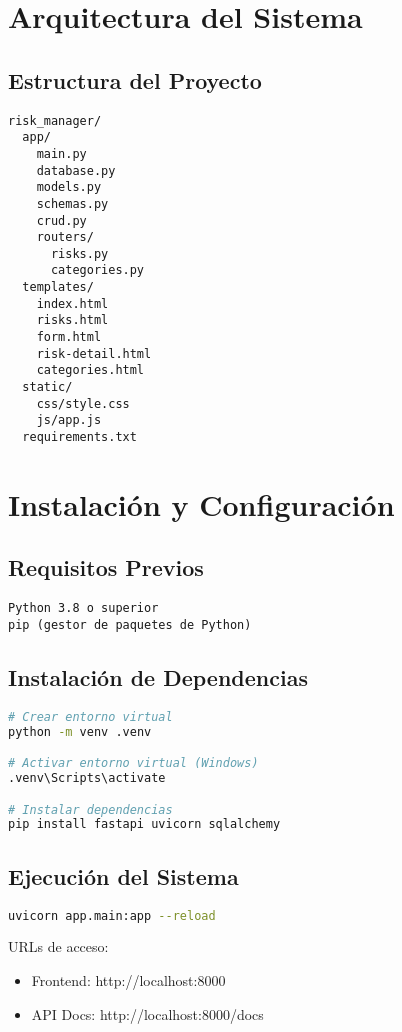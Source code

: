 \documentclass[12pt, a4paper, oneside]{article}
\begin{document}
\section{Arquitectura del Sistema}

\subsection{Estructura del Proyecto}
\begin{verbatim}
risk_manager/
  app/
    main.py
    database.py
    models.py
    schemas.py
    crud.py
    routers/
      risks.py
      categories.py
  templates/
    index.html
    risks.html
    form.html
    risk-detail.html
    categories.html
  static/
    css/style.css
    js/app.js
  requirements.txt
\end{verbatim}

\section{Instalación y Configuración}

\subsection{Requisitos Previos}
\begin{lstlisting}
Python 3.8 o superior
pip (gestor de paquetes de Python)
\end{lstlisting}

\subsection{Instalación de Dependencias}
\begin{lstlisting}[language=bash]
# Crear entorno virtual
python -m venv .venv

# Activar entorno virtual (Windows)
.venv\Scripts\activate

# Instalar dependencias
pip install fastapi uvicorn sqlalchemy
\end{lstlisting}

\subsection{Ejecución del Sistema}
\begin{lstlisting}[language=bash]
uvicorn app.main:app --reload
\end{lstlisting}

URLs de acceso:
\begin{itemize}
    \item Frontend: http://localhost:8000
    \item API Docs: http://localhost:8000/docs
\end{itemize}
\end{document}
